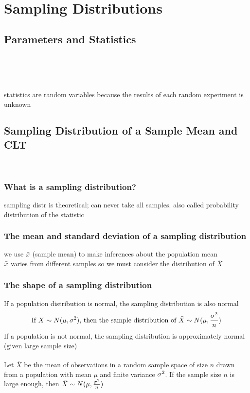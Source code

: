 \chapter{Sampling Distributions}  %

\section{Parameters and Statistics}  %
 \\
\ex{$\mu, \sigma$}


 \\
 \\
statistics are random variables because the results of each random experiment is unknown

\section{Sampling Distribution of a Sample Mean and CLT}  %
 \\
\subsection{What is a sampling distribution?}  %
sampling distr is theoretical; can never take all samples. also called probability distribution of the statistic

\subsection{The mean and standard deviation of a sampling distribution}  %
we use \(\bar{x}\) (sample mean) to make inferences about the population mean \\
\(\bar{x}\) varies from different samples so we must consider the distribution of \(\bar X\) \\

\subsection{The shape of a sampling distribution}  %
If a population distribution is normal, the sampling distribution is also normal
\[
    \text{If } X\sim N(\mu,\sigma^2)\text{, then the sample distribution of }\bar X\sim N(\mu,\frac{\sigma^2}{n})
\]
If a population is not normal, the sampling distribution is approximately normal (given large sample size)\\\\
Let $\bar X$ be the mean of observations in a random sample space of size \(n\) drawn from a population with mean \(\mu\) and finite variance \(\sigma^2\). If the sample size \(n\) is large enough, then \(\bar X\sim N(\mu,\frac{\sigma^2}{n})\)

